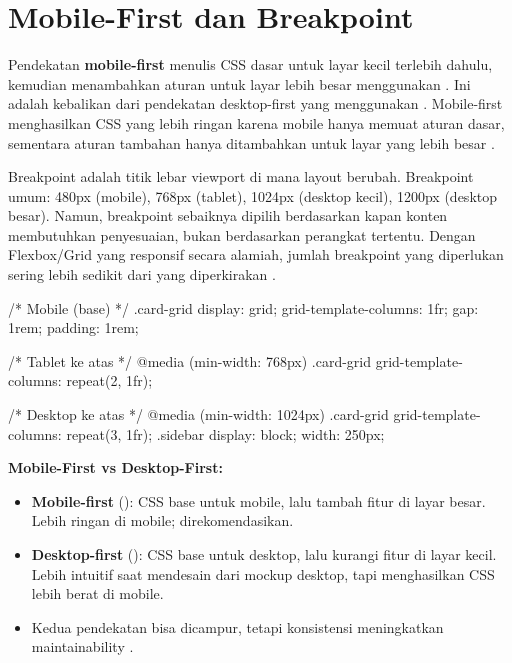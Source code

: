 \section{Mobile-First dan Breakpoint}

Pendekatan \textbf{mobile-first} menulis CSS dasar untuk layar kecil terlebih dahulu, kemudian menambahkan aturan untuk layar lebih besar menggunakan . Ini adalah kebalikan dari pendekatan desktop-first yang menggunakan . Mobile-first menghasilkan CSS yang lebih ringan karena mobile hanya memuat aturan dasar, sementara aturan tambahan hanya ditambahkan untuk layar yang lebih besar \cite{webdevCss}.

Breakpoint adalah titik lebar viewport di mana layout berubah. Breakpoint umum: 480px (mobile), 768px (tablet), 1024px (desktop kecil), 1200px (desktop besar). Namun, breakpoint sebaiknya dipilih berdasarkan kapan konten membutuhkan penyesuaian, bukan berdasarkan perangkat tertentu. Dengan Flexbox/Grid yang responsif secara alamiah, jumlah breakpoint yang diperlukan sering lebih sedikit dari yang diperkirakan \cite{mdnCss}.

\begin{webcode}[language=CSS, caption={Pendekatan mobile-first}]
/* Mobile (base) */
.card-grid {
  display: grid;
  grid-template-columns: 1fr;
  gap: 1rem;
  padding: 1rem;
}

/* Tablet ke atas */
@media (min-width: 768px) {
  .card-grid { grid-template-columns: repeat(2, 1fr); }
}

/* Desktop ke atas */
@media (min-width: 1024px) {
  .card-grid { grid-template-columns: repeat(3, 1fr); }
  .sidebar { display: block; width: 250px; }
}
\end{webcode}

\begin{konsep}
\textbf{Mobile-First vs Desktop-First:}
\begin{itemize}
  \item \textbf{Mobile-first} (): CSS base untuk mobile, lalu tambah fitur di layar besar. Lebih ringan di mobile; direkomendasikan.
  \item \textbf{Desktop-first} (): CSS base untuk desktop, lalu kurangi fitur di layar kecil. Lebih intuitif saat mendesain dari mockup desktop, tapi menghasilkan CSS lebih berat di mobile.
  \item Kedua pendekatan bisa dicampur, tetapi konsistensi meningkatkan maintainability \cite{cssTricks}.
\end{itemize}
\end{konsep}

